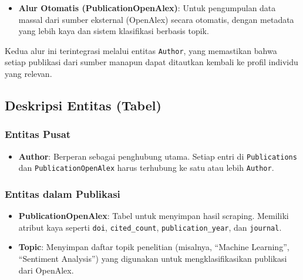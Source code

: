\begin{itemize}
   
    \item \textbf{Alur Otomatis (PublicationOpenAlex)}: 
    Untuk pengumpulan data massal dari sumber eksternal (OpenAlex) secara otomatis, dengan metadata yang 
    lebih kaya dan sistem klasifikasi berbasis topik.
\end{itemize}

Kedua alur ini terintegrasi melalui entitas \texttt{Author}, yang memastikan bahwa setiap publikasi dari 
sumber manapun dapat ditautkan kembali ke profil individu yang relevan.


\subsection{Deskripsi Entitas (Tabel)}

\subsubsection*{Entitas Pusat}
\begin{itemize}
    \item \textbf{Author}: Berperan sebagai penghubung utama. 
    Setiap entri di \texttt{Publications} dan \texttt{PublicationOpenAlex} harus terhubung 
    ke satu atau lebih \texttt{Author}.
\end{itemize}

\subsubsection*{Entitas dalam Publikasi}
\begin{itemize}
    \item \textbf{PublicationOpenAlex}: 
    Tabel untuk menyimpan hasil scraping. Memiliki atribut kaya seperti \texttt{doi}, 
    \texttt{cited\_count}, \texttt{publication\_year}, dan \texttt{journal}.
    
    \item \textbf{Topic}: 
    Menyimpan daftar topik penelitian (misalnya, ``Machine Learning'', ``Sentiment Analysis'') 
    yang digunakan untuk mengklasifikasikan publikasi dari OpenAlex.
\end{itemize}

